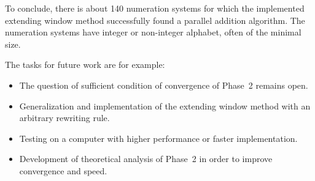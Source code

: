  To conclude, there is about 140 numeration systems for which the implemented extending window method successfully found a parallel addition algorithm. The numeration systems have integer or non-integer alphabet, often of the minimal size.
 
The tasks for future work are for example:

\begin{itemize}
	\item The question of sufficient condition of convergence of Phase~2 remains open.
	\item Generalization and implementation of the extending window method with an arbitrary rewriting rule.
	\item Testing on a  computer with higher performance or faster implementation.
	\item Development of theoretical analysis of Phase~2 in order to improve convergence and speed.
\end{itemize}

